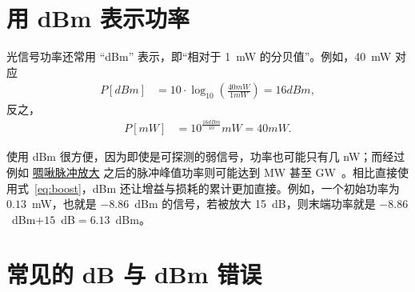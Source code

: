 \section{用 dBm 表示功率}
光信号功率还常用 “dBm” 表示，即“相对于 1~mW 的分贝值”。例如，40~mW 对应
\begin{align}
    P [dBm] &= 10\cdot\log_{10}\left(\frac{40mW}{1mW} \right)=16dBm,
\end{align}
反之，
\begin{align}
    \label{eq:dBm_rev}
    P [mW] &= 10^{\frac{16dBm}{10}}mW=40mW.
\end{align}


使用 dBm 很方便，因为即使是可探测的弱信号，功率也可能只有几 nW；而经过例如 \href{https://youtu.be/Eh5CHRWFT-M}{啁啾脉冲放大} 之后的脉冲峰值功率则可能达到 MW 甚至 GW~\cite{Chirp_STRICKLAND_Nobel_prize}。相比直接使用式~\ref{eq:boost}，dBm 还让增益与损耗的累计更加直接。例如，一个初始功率为 $0.13$~mW，也就是 $-8.86$~dBm 的信号，若被放大 15~dB，则末端功率就是 $-8.86$~dBm$+15$~dB$=6.13$~dBm。


\section{常见的 dB 与 dBm 错误}

